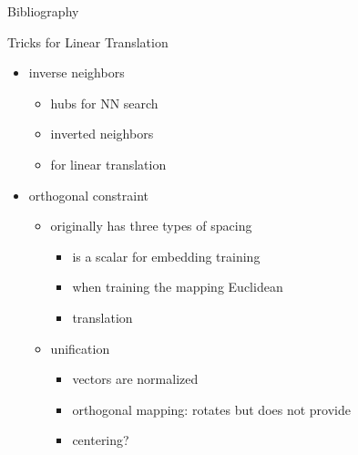 \documentclass[10pt]{beamer}%
\begin{document}
\begin{frame} [allowframebreaks] {Bibliography}
  \printbibliography
\end{frame}

\begin{frame} [allowframebreaks] {Tricks for Linear Translation}
  \begin{itemize}
    \item inverse neighbors
      \begin{itemize}
        \item hubs for NN search \citep{Radovanovic:2010}
        \item inverted neighbors \citep{Singh:2003}
        \item for linear translation \citep{Dinu:2015,Lazaridou:2015}
      \end{itemize}
    \item orthogonal constraint
      \begin{itemize}
        \item originally has three types of spacing
          \begin{itemize}
            \item is a scalar for embedding training
            \item when training the mapping Euclidean
            \item translation
          \end{itemize}
        \item unification \citep{Xing:2015,Faruqui:2014,Artetxe:2016}
          \begin{itemize}
            \item vectors are normalized
            \item orthogonal mapping: rotates but does not provide
            \item centering?
          \end{itemize}
      \end{itemize}
  \end{itemize}
\end{frame}
\end{document}
